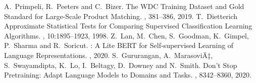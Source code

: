 \documentclass[11pt,dvipdfm]{article}
\begin{document}
\begin{thebibliography}{10}
\begin{small}
A.~Primpeli, R.~Peeters and C.~Bizer. \newblock The {WDC} {Training} {Dataset} and {Gold} {Standard} for {Large}-{Scale} {Product} {Matching}. , 381--386, 2019.
T.~Dietterich \newblock Approximate {Statistical} {Tests} for {Comparing} {Supervised} {Classification} {Learning} {Algorithms}. , 10:1895--1923, 1998.
Z.~Lan, M.~Chen, S.~Goodman, K.~Gimpel, P.~Sharma and R.~Soricut. : {A} {Lite} {BERT} for {Self}-supervised {Learning} of {Language} {Representations}. , 2020.
S.~Gururangan, A.~MarasoviÄ‡, S.~Swayamdipta, K.~Lo, I.~Beltagy, D.~Downey and N.~Smith. \newblock Don't {Stop} {Pretraining}: {Adapt} {Language} {Models} to {Domains} and {Tasks}. , 8342--8360, 2020.

\end{small}
\end{thebibliography}
\end{document}
